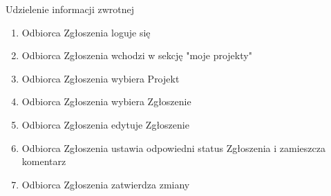 \begin{usecase}{Udzielenie informacji zwrotnej}
	\begin{enumerate}
    \item Odbiorca Zgłoszenia  loguje się
    \item Odbiorca Zgłoszenia wchodzi w sekcję "moje projekty"
    \item Odbiorca Zgłoszenia wybiera Projekt
    \item Odbiorca Zgłoszenia wybiera Zgłoszenie
    \item Odbiorca Zgłoszenia edytuje Zgłoszenie
    \item Odbiorca Zgłoszenia ustawia odpowiedni status Zgłoszenia i zamieszcza komentarz
    \item Odbiorca Zgłoszenia zatwierdza zmiany
	\end{enumerate}
	\beginalternatives
\end{usecase}

